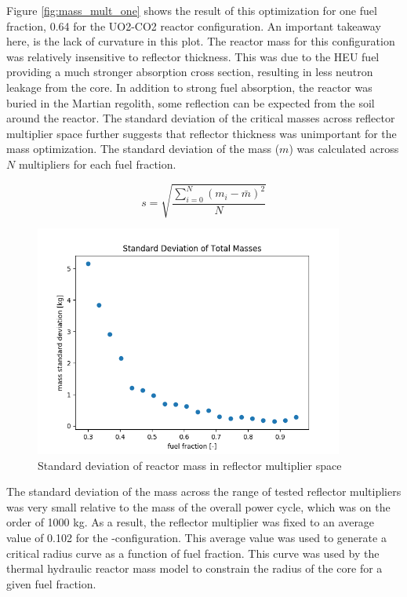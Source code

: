 Figure \ref{fig:mass_mult_one} shows the result of this optimization for one
fuel fraction, 0.64 for the UO2-CO2 reactor configuration. An important takeaway here, is the lack of curvature in
this plot. The reactor mass for this configuration was relatively insensitive to
reflector thickness. This was due to the HEU fuel providing a much
stronger absorption cross section, resulting in less neutron leakage from the core. In
addition to strong fuel absorption, the reactor was buried in the Martian
regolith, some reflection can be expected from the soil around the reactor.
The standard deviation of the critical masses across reflector multiplier space
further suggests that reflector thickness was unimportant for the mass
optimization. The standard deviation of the mass ($m$) was calculated across $N$
multipliers for each fuel fraction.

\begin{equation}
    s = \sqrt{\frac{\sum_{i=0}^{N}(m_i - \bar{m})^2 }{N}}
\end{equation}

\begin{figure}[h]
    \centering
    \includegraphics[width=4in]{../images/mass_std_uo2_co2.png}
\caption{Standard deviation of reactor mass in reflector multiplier space}
\label{fig:mass_std_co2_uo2}
\end{figure}

The standard deviation of the mass across the range of tested reflector
multipliers was very small relative to the mass of the overall power cycle,
which was on the order of 1000 kg. As a result, the reflector multiplier was fixed to an
average value of 0.102 for the \uox-\codiox configuration. 
This average value was used to generate a critical radius
curve as a function of fuel fraction. This curve was used by the thermal
hydraulic reactor mass model to constrain the radius of the core for a given
fuel fraction. 



